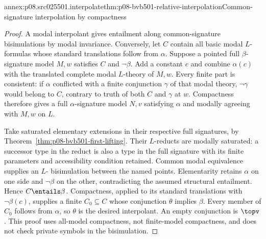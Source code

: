 \begin{annexitem}{annex:p08.src025501.interpolate}{thm:p08-bvb501-relative-interpolation}{Common-signature interpolation by compactness}
\begin{proof}
A modal interpolant gives entailment along common-signature bisimulations
by modal invariance. Conversely, let \(C\) contain all basic modal
\(L\)-formulas whose standard translations follow from \(\alpha\).
Suppose a pointed full \(\beta\)-signature model \(M,w\)
satisfies \(C\) and \(\neg\beta\). Add a constant \(c\) and
combine \(\alpha(c)\) with the translated complete modal
\(L\)-theory of \(M,w\). Every finite part is consistent: if
\(\alpha\) conflicted with a finite conjunction \(\gamma\)
of that modal theory, \(\neg\gamma\) would belong to \(C\),
contrary to truth of both \(C\) and \(\gamma\) at \(w\).
Compactness therefore gives a full \(\alpha\)-signature model
\(N,v\) satisfying \(\alpha\) and modally agreeing with
\(M,w\) on \(L\).

Take saturated elementary extensions in their respective full signatures,
by Theorem~\ref{thm:p08-bvb501-first-lifting}. Their \(L\)-reducts
are modally saturated: a successor type in the reduct is also a type
in the full signature with its finite parameters and accessibility
condition retained. Common modal equivalence supplies an \(L\)-
bisimulation between the named points. Elementarity retains
\(\alpha\) on one side and \(\neg\beta\) on the other,
contradicting the assumed structural entailment. Hence
\(C\entails\beta\). Compactness, applied to its standard
translations with \(\neg\beta(c)\), supplies a finite
\(C_0\subseteq C\) whose conjunction \(\theta\) implies
\(\beta\). Every member of \(C_0\) follows from
\(\alpha\), so \(\theta\) is the desired interpolant.
An empty conjunction is \(\topv\). This proof uses all-model
compactness, not finite-model compactness, and does not check private
symbols in the bisimulation.
\end{proof}
\end{annexitem}

